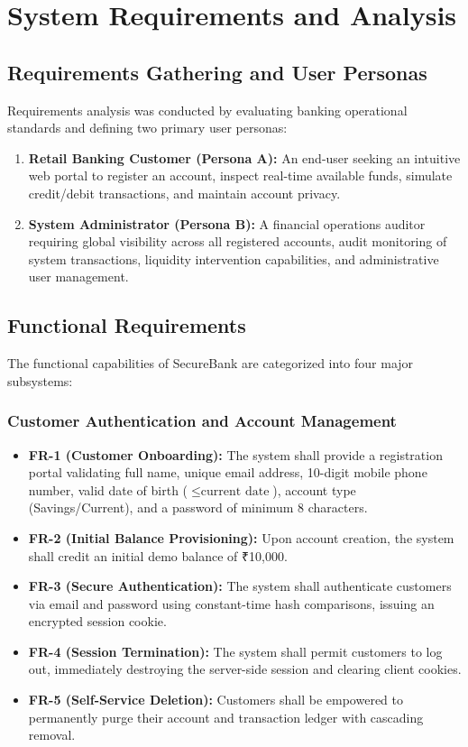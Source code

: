 \chapter{System Requirements and Analysis}

\section{Requirements Gathering and User Personas}
Requirements analysis was conducted by evaluating banking operational standards and defining two primary user personas:
\begin{enumerate}
    \item \textbf{Retail Banking Customer (Persona A):} An end-user seeking an intuitive web portal to register an account, inspect real-time available funds, simulate credit/debit transactions, and maintain account privacy.
    \item \textbf{System Administrator (Persona B):} A financial operations auditor requiring global visibility across all registered accounts, audit monitoring of system transactions, liquidity intervention capabilities, and administrative user management.
\end{enumerate}

\section{Functional Requirements}
The functional capabilities of SecureBank are categorized into four major subsystems:

\subsection{Customer Authentication and Account Management}
\begin{itemize}
    \item \textbf{FR-1 (Customer Onboarding):} The system shall provide a registration portal validating full name, unique email address, 10-digit mobile phone number, valid date of birth ($\le \text{current date}$), account type (Savings/Current), and a password of minimum 8 characters.
    \item \textbf{FR-2 (Initial Balance Provisioning):} Upon account creation, the system shall credit an initial demo balance of ₹10,000.
    \item \textbf{FR-3 (Secure Authentication):} The system shall authenticate customers via email and password using constant-time hash comparisons, issuing an encrypted session cookie.
    \item \textbf{FR-4 (Session Termination):} The system shall permit customers to log out, immediately destroying the server-side session and clearing client cookies.
    \item \textbf{FR-5 (Self-Service Deletion):} Customers shall be empowered to permanently purge their account and transaction ledger with cascading removal.
\end{itemize}

